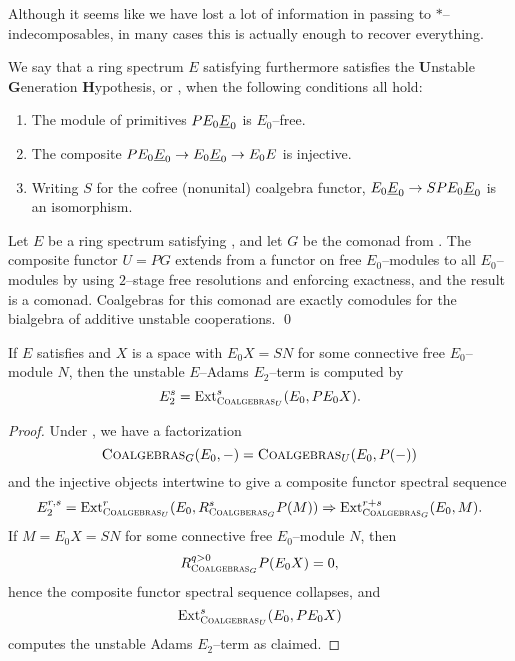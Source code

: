 Although it seems like we have lost a lot of information in passing to \(\ast\)--indecomposables, in many cases this is actually enough to recover everything.  

\begin{definition}
We say that a ring spectrum \(E\) satisfying {\UFH} furthermore satisfies the \textbf{U}nstable \textbf{G}eneration \textbf{H}ypothesis, or , when the following conditions all hold:
\begin{enumerate}
    \item The module of primitives \(P E_0 \OS{E}{0}\) is \(E_0\)--free.
    \item The composite \(P E_0 \OS{E}{0} \to E_0 \OS{E}{0} \to E_0 E\) is injective.
    \item Writing \(S\) for the cofree (nonunital) coalgebra functor, \(E_0 \OS{E}{0} \to SP E_0 \OS{E}{0}\) is an isomorphism.
\end{enumerate}
\end{definition}

\begin{lemma}\label{ShorterUnstableResns}
Let \(E\) be a ring spectrum satisfying {\UGH}, and let \(G\) be the comonad from .  The composite functor \(U = P G\) extends from a functor on free \(E_0\)--modules to all \(E_0\)--modules by using \(2\)--stage free resolutions and enforcing exactness, and the result is a comonad.  Coalgebras for this comonad are exactly comodules for the bialgebra of additive unstable cooperations. \qed
\end{lemma}

\begin{corollary}
If \(E\) satisfies {\UGH} and \(X\) is a space with \(E_0 X = SN\) for some connective free \(E_0\)--module \(N\), then the unstable \(E\)--Adams \(E_2\)--term is computed by \[E_2^s = \operatorname{Ext}^s_{\normalfont\textsc{Coalgebras}_U}(E_0, P E_0 X).\]
\end{corollary}
\begin{proof}
Under {\UGH}, we have a factorization \[\normalfont\textsc{Coalgebras}_{G}(E_0, -) = \normalfont\textsc{Coalgebras}_{U}(E_0, P(-))\] and the injective objects intertwine to give a composite functor spectral sequence \[E_2^{r, s} = \operatorname{Ext}^r_{\normalfont\textsc{Coalgebras}_U}(E_0, R^s_{\normalfont\textsc{Coalgberas}_G} P(M)) \Rightarrow \operatorname{Ext}^{r+s}_{\normalfont\textsc{Coalgebras}_G}(E_0, M).\]  If \(M = E_0 X = SN\) for some connective free \(E_0\)--module \(N\), then \[R^{q > 0}_{\normalfont\textsc{Coalgebras}_G} P(E_0 X) = 0,\] hence the composite functor spectral sequence collapses, and \[\operatorname{Ext}^s_{\normalfont\textsc{Coalgebras}_U}(E_0, P E_0 X)\] computes the unstable Adams \(E_2\)--term as claimed.
\end{proof}


